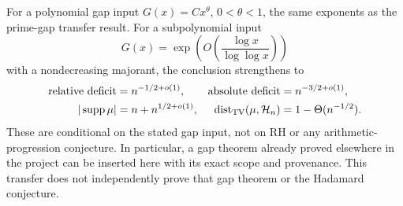 For a polynomial gap input $G(x)=Cx^\theta$, $0<\theta<1$, the same
exponents as the prime-gap transfer result. For a subpolynomial input
\[
 G(x)=\exp\!\left(O\!\left(\frac{\log x}{\log\log x}\right)\right)
\]
with a nondecreasing majorant, the conclusion strengthens to
\begin{align*}
 \text{relative deficit}&=n^{-1/2+o(1)},&
 \text{absolute deficit}&=n^{-3/2+o(1)},\\
 |\operatorname{supp}\mu|&=n+n^{1/2+o(1)},&
 \operatorname{dist}_{\rm TV}(\mu,\mathcal H_n)&=1-\Theta(n^{-1/2}).
\end{align*}
These are conditional on the stated gap input, not on RH or any
arithmetic-progression conjecture. In particular, a gap theorem already
proved elsewhere in the project can be inserted here with its exact
scope and provenance. This transfer does not independently prove that
gap theorem or the Hadamard conjecture.

